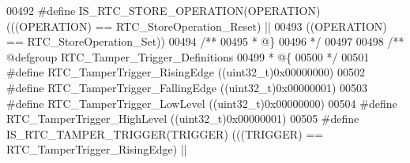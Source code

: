 \begin{DoxyCode}
00492 \textcolor{preprocessor}{#}\textcolor{preprocessor}{define} \textcolor{preprocessor}{IS\_RTC\_STORE\_OPERATION}\textcolor{preprocessor}{(}\textcolor{preprocessor}{OPERATION}\textcolor{preprocessor}{)} \textcolor{preprocessor}{(}\textcolor{preprocessor}{(}\textcolor{preprocessor}{(}\textcolor{preprocessor}{OPERATION}\textcolor{preprocessor}{)} \textcolor{preprocessor}{==} 
      RTC_StoreOperation_Reset\textcolor{preprocessor}{)} \textcolor{preprocessor}{||}
00493                                            \textcolor{preprocessor}{(}\textcolor{preprocessor}{(}\textcolor{preprocessor}{OPERATION}\textcolor{preprocessor}{)} \textcolor{preprocessor}{==} 
      RTC_StoreOperation_Set\textcolor{preprocessor}{)}\textcolor{preprocessor}{)}
00494 \textcolor{comment}{/**}
00495 \textcolor{comment}{  * @\}}
00496 \textcolor{comment}{  */}
00497 
00498 \textcolor{comment}{/** @defgroup RTC\_Tamper\_Trigger\_Definitions }
00499 \textcolor{comment}{  * @\{}
00500 \textcolor{comment}{  */}
00501 \textcolor{preprocessor}{#}\textcolor{preprocessor}{define} \textcolor{preprocessor}{RTC\_TamperTrigger\_RisingEdge}            \textcolor{preprocessor}{(}\textcolor{preprocessor}{(}\textcolor{preprocessor}{uint32\_t}\textcolor{preprocessor}{)}0x00000000\textcolor{preprocessor}{)}
00502 \textcolor{preprocessor}{#}\textcolor{preprocessor}{define} \textcolor{preprocessor}{RTC\_TamperTrigger\_FallingEdge}           \textcolor{preprocessor}{(}\textcolor{preprocessor}{(}\textcolor{preprocessor}{uint32\_t}\textcolor{preprocessor}{)}0x00000001\textcolor{preprocessor}{)}
00503 \textcolor{preprocessor}{#}\textcolor{preprocessor}{define} \textcolor{preprocessor}{RTC\_TamperTrigger\_LowLevel}              \textcolor{preprocessor}{(}\textcolor{preprocessor}{(}\textcolor{preprocessor}{uint32\_t}\textcolor{preprocessor}{)}0x00000000\textcolor{preprocessor}{)}
00504 \textcolor{preprocessor}{#}\textcolor{preprocessor}{define} \textcolor{preprocessor}{RTC\_TamperTrigger\_HighLevel}             \textcolor{preprocessor}{(}\textcolor{preprocessor}{(}\textcolor{preprocessor}{uint32\_t}\textcolor{preprocessor}{)}0x00000001\textcolor{preprocessor}{)}
00505 \textcolor{preprocessor}{#}\textcolor{preprocessor}{define} \textcolor{preprocessor}{IS\_RTC\_TAMPER\_TRIGGER}\textcolor{preprocessor}{(}\textcolor{preprocessor}{TRIGGER}\textcolor{preprocessor}{)} \textcolor{preprocessor}{(}\textcolor{preprocessor}{(}\textcolor{preprocessor}{(}\textcolor{preprocessor}{TRIGGER}\textcolor{preprocessor}{)} \textcolor{preprocessor}{==} 
      RTC_TamperTrigger_RisingEdge\textcolor{preprocessor}{)} \textcolor{preprocessor}{||}

\end{DoxyCode}
